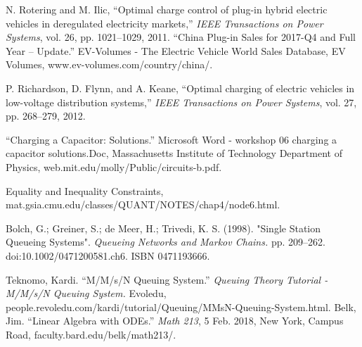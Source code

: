 \documentclass[10pt]{article}
\begin{document}
\newpage
\begin{thebibliography}{9}
N. Rotering and M. Ilic, “Optimal charge control of plug-in hybrid electric vehicles in deregulated electricity markets,”
\textit{IEEE Transactions on Power Systems}, vol. 26, pp. 1021–1029, 2011.
“China Plug-in Sales for 2017-Q4 and Full Year – Update.” EV-Volumes - The Electric Vehicle World Sales Database, EV Volumes, www.ev-volumes.com/country/china/. 
 
P. Richardson, D. Flynn, and A. Keane, “Optimal charging of electric vehicles in low-voltage distribution systems,” \textit{IEEE Transactions on Power Systems}, vol. 27, pp. 268–279, 2012. 

 “Charging a Capacitor: Solutions.” Microsoft Word - workshop 06 charging a capacitor solutions.Doc, Massachusetts Institute of Technology Department of Physics, web.mit.edu/molly/Public/circuits-b.pdf. 

Equality and Inequality Constraints, mat.gsia.cmu.edu/classes/QUANT/NOTES/chap4/node6.html. 

Bolch, G.; Greiner, S.; de Meer, H.; Trivedi, K. S. (1998). "Single Station Queueing Systems". \textit{Queueing Networks and Markov Chains.} pp. 209–262. doi:10.1002/0471200581.ch6. ISBN 0471193666.

Teknomo, Kardi. “M/M/s/N Queuing System.” \textit{Queuing Theory Tutorial - M/M/s/N Queuing System.} Evoledu, people.revoledu.com/kardi/tutorial/Queuing/MMsN-Queuing-System.html.
Belk, Jim. “Linear Algebra with ODEs.” \textit{Math 213}, 5 Feb. 2018, New York, Campus Road, faculty.bard.edu/belk/math213/.
\end{thebibliography}
\end{document}
